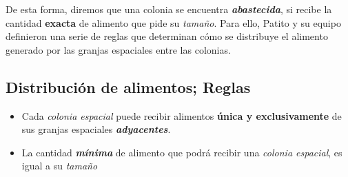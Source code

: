 \vspace{10mm}

\noindent De esta forma, diremos que una colonia se encuentra \emph{\textbf{abastecida}}, si recibe la cantidad \textbf{exacta} de alimento que pide su \emph{tamaño}. Para ello, Patito y su equipo definieron una serie de reglas %
que determinan cómo se distribuye el alimento generado por las granjas espaciales entre las colonias.

\vspace{10mm}

\subsection*{Distribución de alimentos; Reglas}

\begin{itemize}
\item Cada \emph{colonia espacial} puede recibir alimentos \textbf{única y exclusivamente} de sus granjas espaciales \emph{\textbf{adyacentes}}.
\item La cantidad \emph{\textbf{mínima}} de alimento que podrá recibir una \emph{colonia espacial}, es igual a su \emph{tamaño}
\end{itemize}
